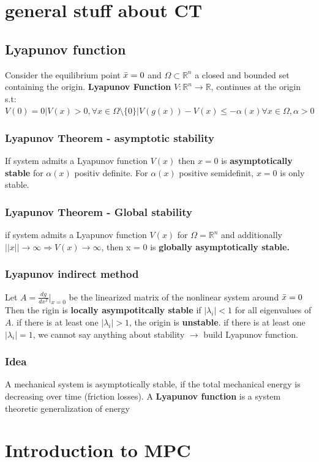 \section{general stuff about CT}
\subsection{Lyapunov function}
Consider the equilibrium point $\Bar{x}=0$ and $\Omega\subset \mathbb{R}^n$ a closed and bounded set containing the origin. \textbf{Lyapunov Function} $V:\mathbb{R}^n \rightarrow \mathbb{R}$, continues at the origin s.t: $V(0) = 0 |V(x)>0 , \forall x \in \Omega\setminus\{0\}|V(g(x))- V(x)\leq -\alpha(x)\forall x\in \Omega,\alpha > 0$ 
\subsubsection{Lyapunov Theorem - asymptotic stability}
If system admits a Lyapunov function $V(x)$ then $x = 0$ is \textbf{asymptotically stable} for $\alpha(x)$ positiv definite. For $\alpha(x)$ positive semidefinit, $x=0$ is only stable.
\subsubsection{Lyapunov Theorem - Global stability}
if system admits a Lyapunov function $V(x)$ for $\Omega = \mathbb{R}^n$ and additionally $||x|| \rightarrow \infty \Rightarrow V(x) \rightarrow\infty$, then x = 0 is \textbf{globally asymptotically stable.}
\subsubsection{Lyapunov indirect method}
Let $A = \frac{dg}{dx^T}{\Big|}_{x=0}$ be the linearized matrix of the nonlinear system around $\Bar{x}=0$\\
Then the rigin is \textbf{locally asympotitcally stable} if $|\lambda_i|<1$ for all eigenvalues of $A$. if there is at least one $|\lambda_i|>1$, the origin is \textbf{unstable}. if there is at least one $|\lambda_i|=1$, we cannot say anything about stability $\rightarrow$ build Lyapunov function.
\subsubsection{Idea}
 A mechanical system is asymptotically stable, if the total mechanical energy is decreasing over time (friction losses). A \textbf{Lyapunov function} is a system theoretic generalization of energy
\section{Introduction to MPC} 
